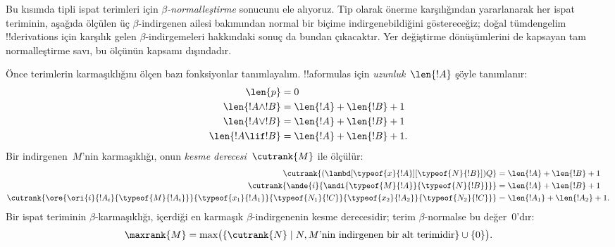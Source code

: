 \documentclass[../../../include/open-logic-section]{subfiles}
\begin{document}


Bu kısımda tipli ispat terimleri için \emph{$\beta$-normalleştirme}
sonucunu ele alıyoruz. Tip olarak önerme karşılığından yararlanarak her ispat
teriminin, aşağıda ölçülen üç $\beta$-indirgenen ailesi bakımından normal bir
biçime indirgenebildiğini göstereceğiz; doğal tümdengelim !!{derivation}s için
karşılık gelen $\beta$-indirgemeleri hakkındaki sonuç da bundan çıkacaktır.
Yer değiştirme dönüşümlerini de kapsayan tam normalleştirme savı, bu ölçünün
kapsamı dışındadır.

Önce terimlerin karmaşıklığını ölçen bazı fonksiyonlar tanımlayalım.
!!a{formula}s için \emph{uzunluk}~$\len{!A}$ şöyle tanımlanır:
\begin{align*}
  \len{p} &= 0\\
  \len{!A \land !B} &= \len{!A} + \len{!B} + 1\\
  \len{!A \lor !B} &= \len{!A} + \len{!B} + 1 \\
  \len{!A \lif !B} &= \len{!A} + \len{!B} + 1.
\end{align*}
Bir indirgenen~$M$'nin karmaşıklığı, onun \emph{kesme
  derecesi}~$\cutrank{M}$ ile ölçülür:
\begin{align*}
  \cutrank{(\lambd[\typeof{x}{!A}][\typeof{N}{!B}])Q} &=
  \len{!A} + \len{!B} + 1 \\
  \cutrank{\ande{i}{\andi{\typeof{M}{!A}}{\typeof{N}{!B}}}} &=
  \len{!A} + \len{!B} + 1 \\
  \cutrank{\ore{\ori{i}{!A_{i}}{\typeof{M}{!A_i}}}
    {\typeof{x_1}{!A_1}}{\typeof{N_1}{!C}}
    {\typeof{x_2}{!A_2}}{\typeof{N_2}{!C}}} &=
  \len{!A_1} + \len{!A_2} + 1.
\end{align*}
Bir ispat teriminin $\beta$-karmaşıklığı, içerdiği en karmaşık
$\beta$-indirgenenin kesme derecesidir; terim $\beta$-normalse bu değer~$0$'dır:
\[
  \maxrank{M} = \max \bigl(\{\cutrank{N} \mid N, M\text{'nin indirgenen
    bir alt terimidir}\}\cup\{0\}\bigr).
\]
\end{document}
